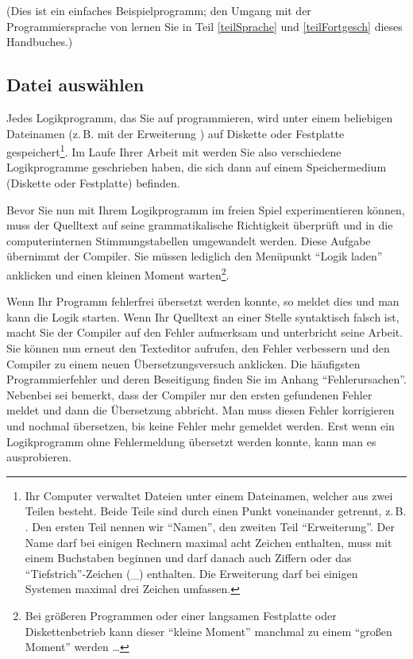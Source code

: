 (Dies ist ein einfaches Beispielprogramm; den Umgang mit der
Programmiersprache von \mutabor{} lernen Sie in Teil \ref{teilSprache} und \ref{teilFortgesch} dieses Handbuches.)

\subsection{Datei auswählen}\label{sec:datei-auswahlen}

Jedes Logikprogramm, das Sie auf \mutabor{} programmieren, wird unter
einem beliebigen Dateinamen (z.\,B. mit der Erweiterung  )
auf Diskette oder Festplatte gespeichert\footnote{Ihr Computer
  verwaltet Dateien unter einem Dateinamen, welcher aus zwei Teilen
  besteht.  Beide Teile sind durch einen Punkt voneinander getrennt,
  z.\,B. .  Den ersten Teil nennen wir "`Namen"', den
  zweiten Teil "`Erweiterung"'. Der Name darf bei einigen Rechnern
  maximal acht Zeichen enthalten, muss mit einem Buchstaben beginnen
  und darf danach auch Ziffern oder das "`Tiefstrich"'-Zeichen (\_)
  enthalten. Die Erweiterung darf bei einigen Systemen maximal drei
  Zeichen umfassen.}. Im Laufe Ihrer Arbeit mit \mutabor{} werden Sie
also verschiedene Logikprogramme geschrieben haben, die sich dann auf
einem Speichermedium (Diskette oder Festplatte) befinden.

Bevor Sie nun mit Ihrem Logikprogramm im freien Spiel experimentieren
können, muss der Quelltext auf seine grammatikalische Richtigkeit
überprüft und in die computerinternen Stimmungstabellen umgewandelt werden. Diese
Aufgabe übernimmt der Compiler. Sie müssen lediglich den Menüpunkt
"`Logik laden"' anklicken und einen kleinen Moment 
warten\footnote{Bei größeren Programmen oder einer langsamen 
Festplatte oder Diskettenbetrieb kann dieser "`kleine Moment"' 
manchmal zu einem "`großen Moment"' werden \dots{}}.

Wenn Ihr Programm fehlerfrei übersetzt werden konnte, so meldet
dies \mutabor{} und man kann die Logik starten. 
Wenn Ihr Quelltext an einer Stelle syntaktisch falsch ist, macht
Sie der Compiler auf den Fehler aufmerksam und unterbricht seine
Arbeit. Sie können nun erneut den Texteditor aufrufen, den Fehler
verbessern und den Compiler zu einem neuen Übersetzungsversuch
anklicken. Die häufigsten Programmierfehler und deren Beseitigung
finden Sie im Anhang "`Fehlerursachen"'. Nebenbei sei bemerkt,
dass der Compiler nur den ersten gefundenen Fehler meldet und dann
die Übersetzung abbricht. Man muss diesen Fehler korrigieren und
nochmal übersetzen, bis keine Fehler mehr gemeldet werden.
Erst wenn ein Logikprogramm ohne Fehlermeldung übersetzt werden
konnte, kann man es ausprobieren.

